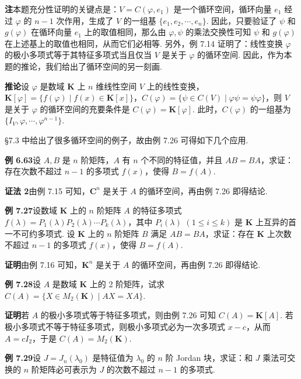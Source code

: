 \documentclass[UTF8, 12pt, fontset=fandol, oneside]{ctexart}
\begin{document}
\noindent\textbf{注}\quad 本题充分性证明的关键点是：$V=C(\varphi,e_1)$ 是一个循环空间，循环向量 $e_1$ 经过 $\varphi$ 的 $n-1$ 次作用，生成了 $V$ 的一组基 $\{e_1,e_2,\cdots,e_n\}$. 因此，只要验证了 $\psi$ 和 $g(\varphi)$ 在循环向量 $e_1$ 上的取值相同，那么由 $\varphi,\psi$ 的乘法交换性可知 $\psi$ 和 $g(\varphi)$ 在上述基上的取值也相同，从而它们必相等. 另外，例 7.14 证明了：线性变换 $\varphi$ 的极小多项式等于其特征多项式当且仅当 $V$ 是关于 $\varphi$ 的循环空间. 因此，作为本题的推论，我们给出了循环空间的另一刻画.

\noindent\textbf{推论}\quad 设 $\varphi$ 是数域 $\mathbf{K}$ 上 $n$ 维线性空间 $V$ 上的线性变换，$\mathbf{K}[\varphi]=\{f(\varphi)\mid f(x)\in\mathbf{K}[x]\}$，$C(\varphi)=\{\psi\in C(V)\mid \varphi\psi=\psi\varphi\}$，则 $V$ 是关于 $\varphi$ 的循环空间的充要条件是 $C(\varphi)=\mathbf{K}[\varphi]$. 此时，$C(\varphi)$ 的一组基为 $\{I_V,\varphi,\cdots,\varphi^{n-1}\}$.

§7.3 中给出了很多循环空间的例子，故由例 7.26 可得如下几个应用.

\noindent\textbf{例 6.63}\quad 设 $A,B$ 是 $n$ 阶矩阵，$A$ 有 $n$ 个不同的特征值，并且 $AB=BA$，求证：存在次数不超过 $n-1$ 的多项式 $f(x)$，使得 $B=f(A)$.

\noindent\textbf{证法 2}\quad 由例 7.15 可知，$\mathbf{C}^n$ 是关于 $A$ 的循环空间，再由例 7.26 即得结论.

\noindent\textbf{例 7.27}\quad 设数域 $\mathbf{K}$ 上的 $n$ 阶矩阵 $A$ 的特征多项式 $f(\lambda)=P_1(\lambda)P_2(\lambda)\cdots P_k(\lambda)$，其中 $P_i(\lambda)$ $(1\le i\le k)$ 是 $\mathbf{K}$ 上互异的首一不可约多项式. 设 $\mathbf{K}$ 上的 $n$ 阶矩阵 $B$ 满足 $AB=BA$，求证：存在 $\mathbf{K}$ 上次数不超过 $n-1$ 的多项式 $f(x)$，使得 $B=f(A)$.

\noindent\textbf{证明}\quad 由例 7.16 可知，$\mathbf{K}^n$ 是关于 $A$ 的循环空间，再由例 7.26 即得结论.

\noindent\textbf{例 7.28}\quad 设 $A$ 是数域 $\mathbf{K}$ 上的 2 阶矩阵，试求 $C(A)=\{X\in M_2(\mathbf{K})\mid AX=XA\}$.

\noindent\textbf{证明}\quad 若 $A$ 的极小多项式等于特征多项式，则由例 7.26 可知 $C(A)=\mathbf{K}[A]$. 若极小多项式不等于特征多项式，则极小多项式必为一次多项式 $x-c$，从而 $A=cI_2$，于是 $C(A)=M_2(\mathbf{K})$.

\noindent\textbf{例 7.29}\quad 设 $J=J_n(\lambda_0)$ 是特征值为 $\lambda_0$ 的 $n$ 阶 Jordan 块，求证：和 $J$ 乘法可交换的 $n$ 阶矩阵必可表示为 $J$ 的次数不超过 $n-1$ 的多项式.
\end{document}
